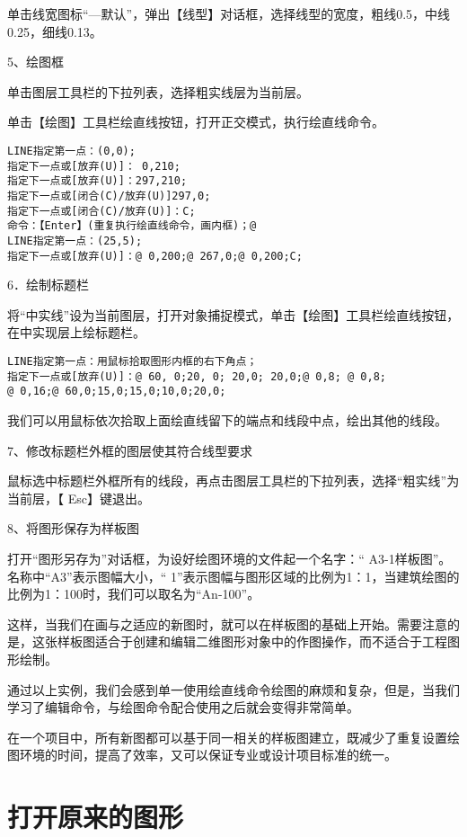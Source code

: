单击线宽图标“—默认”，弹出【线型】对话框，选择线型的宽度，粗线0.5，中线0.25，细线0.13。

5、绘图框

单击图层工具栏的下拉列表，选择粗实线层为当前层。

单击【绘图】工具栏绘直线按钮，打开正交模式，执行绘直线命令。

\begin{verbatim}
LINE指定第一点：(0,0);
指定下一点或[放弃(U)]： 0,210;
指定下一点或[放弃(U)]：297,210;
指定下一点或[闭合(C)/放弃(U)]297,0;
指定下一点或[闭合(C)/放弃(U)]：C;
命令：【Enter】(重复执行绘直线命令，画内框)；@
LINE指定第一点：(25,5);
指定下一点或[放弃(U)]：@ 0,200;@ 267,0;@ 0,200;C;
\end{verbatim}

6．绘制标题栏

将“中实线”设为当前图层，打开对象捕捉模式，单击【绘图】工具栏绘直线按钮，在中实现层上绘标题栏。

\begin{verbatim}
LINE指定第一点：用鼠标拾取图形内框的右下角点；
指定下一点或[放弃(U)]：@ 60, 0;20, 0; 20,0; 20,0;@ 0,8; @ 0,8;
@ 0,16;@ 60,0;15,0;15,0;10,0;20,0;
\end{verbatim}

我们可以用鼠标依次拾取上面绘直线留下的端点和线段中点，绘出其他的线段。

7、修改标题栏外框的图层使其符合线型要求

鼠标选中标题栏外框所有的线段，再点击图层工具栏的下拉列表，选择“粗实线”为当前层，【 Esc】键退出。

8、将图形保存为样板图 

打开“图形另存为”对话框，为设好绘图环境的文件起一个名字：“ A3-1样板图”。名称中“A3”表示图幅大小，“ 1”表示图幅与图形区域的比例为1：1，当建筑绘图的比例为1：100时，我们可以取名为“An-100”。

这样，当我们在画与之适应的新图时，就可以在样板图的基础上开始。需要注意的是，这张样板图适合于创建和编辑二维图形对象中的作图操作，而不适合于工程图形绘制。

通过以上实例，我们会感到单一使用绘直线命令绘图的麻烦和复杂，但是，当我们学习了编辑命令，与绘图命令配合使用之后就会变得非常简单。

在一个项目中，所有新图都可以基于同一相关的样板图建立，既减少了重复设置绘图环境的时间，提高了效率，又可以保证专业或设计项目标准的统一。

\chapter{打开原来的图形}


